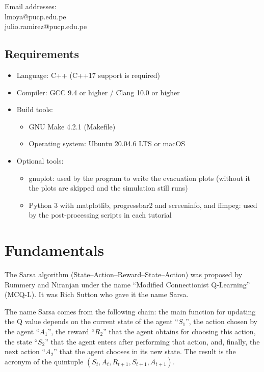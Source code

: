 \documentclass[12pt,a4paper]{book}
\begin{document}
\medskip
\noindent Email addresses:\\
lmoya@pucp.edu.pe\\
julio.ramirez@pucp.edu.pe

\section{Requirements}
\begin{itemize}
  \item Language: C++ (C++17 support is required)
  \item Compiler: GCC 9.4 or higher / Clang 10.0 or higher
  \item Build tools:
    \begin{itemize}
      \item GNU Make 4.2.1 (Makefile)
      \item Operating system: Ubuntu 20.04.6 LTS or macOS
    \end{itemize}
  \item Optional tools:
    \begin{itemize}
      \item gnuplot: used by the program to write the evacuation plots (without it the plots are
        skipped and the simulation still runs)
      \item Python 3 with matplotlib, progressbar2 and screeninfo, and ffmpeg: used by the
        post-processing scripts in each tutorial
    \end{itemize}
\end{itemize}

\chapter{Fundamentals}

The Sarsa algorithm (State--Action--Reward--State--Action) was proposed by Rummery and Niranjan
under the name ``Modified Connectionist Q-Learning'' (MCQ-L). It was Rich Sutton who gave it the
name Sarsa.

The name Sarsa comes from the following chain: the main function for updating the Q value depends
on the current state of the agent ``$S_1$'', the action chosen by the agent ``$A_1$'', the reward
``$R_2$'' that the agent obtains for choosing this action, the state ``$S_2$'' that the agent enters
after performing that action, and, finally, the next action ``$A_2$'' that the agent chooses in its
new state. The result is the acronym of the quintuple $(S_t, A_t, R_{t+1}, S_{t+1}, A_{t+1})$.
\end{document}
